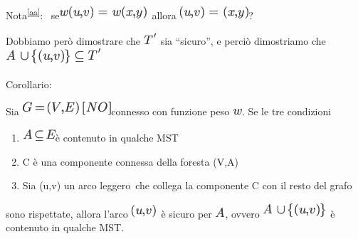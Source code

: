 \documentclass{article}
\providecommand{\tightlist}{%
  \setlength{\itemsep}{0pt}\setlength{\parskip}{0pt}}
\begin{document}
{}

{Nota}\textsuperscript{\protect\hyperlink{cmnt27}{{[}aa{]}}}{:
~se}\includegraphics{images/image464.png}{~allora
}\includegraphics{images/image465.png}{?}

{}

{Dobbiamo però dimostrare che
}\includegraphics{images/image463.png}{~sia ``sicuro'', e perciò
dimostriamo che }\includegraphics{images/image466.png}

{}

{Corollario:}

{Sia }\includegraphics{images/image420.png}{connesso con funzione peso
}\includegraphics{images/image224.png}{. Se le tre condizioni}

\begin{enumerate}
\tightlist
\item
  \includegraphics{images/image445.png}{è contenuto in qualche MST}
\item
  {C è una componente connessa della foresta (V,A)}
\item
  {Sia (u,v) un arco }{leggero}{~che collega la componente C con il
  resto del grafo}
\end{enumerate}

{sono rispettate, allora l'arco
}\includegraphics{images/image449.png}{~è }{sicuro }{per
}\includegraphics{images/image73.png}{, ovvero
}\includegraphics{images/image450.png}{~è contenuto in qualche MST.}
\end{document}
